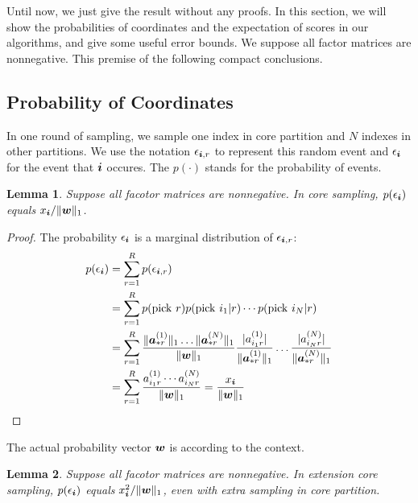 \documentclass[letterpaper]{article}
\newcommand{\Sca}[3]{{#1}^{(#2)}_{i_#2#3}}%
\newcommand{\V}[1]{{\bm{{\MakeLowercase{#1}}}}}
\newcommand{\VnC}[3]{\V{#1}^{(#2)}_{#3}}
\newcommand{\Nrocl}[2]{\norm{\VnC{a}{#1}{*#2}}{1}}
\newcommand{\norm}[2]{\|#1\|_{#2}}
\newcommand{\WreightR}{\Nrocl{1}{r}\ldots\Nrocl{N}{r}}
\newtheorem{lemma}{Lemma}
\begin{document}
Until now, we just give the result without any proofs.
In this section,
we will show the probabilities of coordinates and the expectation of scores in our algorithms,
and give some useful error bounds.
We suppose all factor matrices are nonnegative.
This premise of the following compact conclusions.

\subsection{Probability of Coordinates}
In one round of sampling,
we sample one index in core partition and $N$ indexes in other partitions.
We use the notation $\epsilon_{\V{i},r}$ to represent this random event
and $\epsilon_{\V{i}}$ for the event that $\V{i}$ occures.
The $p(\cdot)$ stands for the probability of events.
\begin{lemma}\label{lem:Probability}
    Suppose all facotor matrices are nonnegative.
    In core sampling, $p(\epsilon_{\V{i}})$ equals $x_{\V{i}}/\norm{\V{w}}{1}$.
\end{lemma}
\begin{proof}
The probability $\epsilon_{\V{i}}$ is a marginal distribution of $\epsilon_{\V{i},r}$:
\begin{align*}
p(\epsilon_{\V{i}})
& = \sum_{r=1}^{R} p(\epsilon_{\V{i},r}) \\
& = \sum_{r=1}^{R} p({\rm pick\ }r)p({\rm pick\ }i_1|r)\cdots p({\rm pick\ }i_N|r)\\
& = \sum_{r=1}^{R} \frac{\WreightR}{\norm{\V{W}}{1}}
    \frac{|\Sca{a}{1}{r}|}{\Nrocl{1}{r}}\ldots\frac{|\Sca{a}{N}{r}|}{\Nrocl{N}{r}}\\
& = \sum_{r=1}^{R} \frac{\Sca{a}{1}{r}\cdots\Sca{a}{N}{r}}{\norm{\V{W}}{1}}
  = \frac{x_{\V{i}}}{\norm{\V{w}}{1}}
\end{align*}
\end{proof}
The actual probability vector $\V{w}$ is according to the context.
\begin{lemma}\label{lem:ExtensionProbability}
    Suppose all facotor matrices are nonnegative.
    In extension core sampling, $p(\epsilon_{\V{i}})$ equals $x^2_{\V{i}}/\norm{\V{w}}{1}$,
    even with extra sampling in core partition.
\end{lemma}
\end{document}
